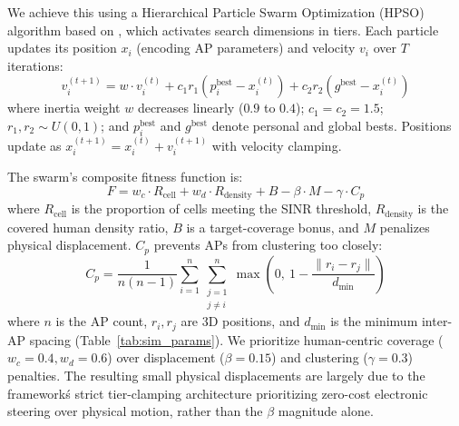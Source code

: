 \documentclass[conference]{IEEEtran}
\begin{document}
	We achieve this using a Hierarchical Particle Swarm Optimization (HPSO)  
	algorithm based on \cite{b11,b13}, which activates search dimensions in    
	tiers. Each particle updates its position $x_i$ (encoding AP parameters)   
	and velocity $v_i$ over $T$ iterations:                                    
	\begin{equation}                                                         
		v_i^{(t+1)} = w \cdot v_i^{(t)} + c_1 r_1 (p_i^{\text{best}} -       
		x_i^{(t)}) + c_2 r_2 (g^{\text{best}} - x_i^{(t)})                         
		\label{eq:pso_velocity}                                              
	\end{equation}                                                           
	where inertia weight $w$ decreases linearly ($0.9$ to $0.4$); $c_1 = c_2 
	= 1.5$; $r_1, r_2 \sim U(0,1)$; and $p_i^{\text{best}}$ and                
	$g^{\text{best}}$ denote personal and global bests. Positions update as    
	$x_i^{(t+1)} = x_i^{(t)} + v_i^{(t+1)}$ with velocity clamping.            
	
	The swarm's composite fitness function is:                               
	\begin{equation}                                                         
		F = w_c \cdot R_{\text{cell}} + w_d \cdot R_{\text{density}} + B -   
		\beta \cdot M - \gamma \cdot C_p
		\label{eq:fitness}
	\end{equation}
	where $R_{\text{cell}}$ is the proportion of cells meeting the SINR      
	threshold, $R_{\text{density}}$ is the covered human density ratio, $B$ is 
	a target-coverage bonus, and $M$ penalizes physical displacement. $C_p$    
	prevents APs from clustering too closely:
	\begin{equation}
		C_p = \frac{1}{n(n-1)} \sum_{i=1}^{n}\sum_{\substack{j=1 \\ j \ne    
				i}}^{n} \max\left(0,\ 1 - \frac{\|r_i - r_j\|}{d_{\min}}\right)            
		\label{eq:clustering_penalty}
	\end{equation}
	where $n$ is the AP count, $r_i, r_j$ are 3D positions, and $d_{\min}$ is
	the minimum inter-AP spacing (Table~\ref{tab:sim_params}). We prioritize   
	human-centric coverage ($w_c = 0.4, w_d = 0.6$) over displacement ($\beta =
	0.15$) and clustering ($\gamma = 0.3$) penalties. The resulting small physical displacements are largely due to the framework\'s strict tier-clamping architecture prioritizing zero-cost electronic steering over physical motion, rather than the $\beta$ magnitude alone.
	
\end{document}
